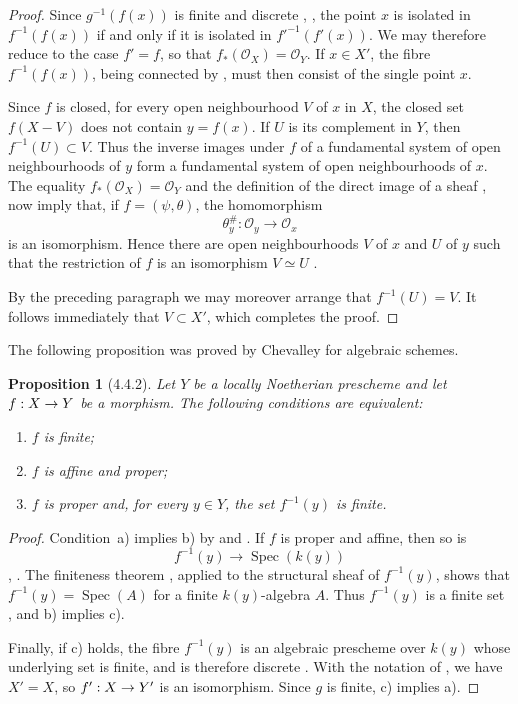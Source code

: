 \documentclass[oneside]{amsart}
\theoremstyle{ega-env-style}
\theoremstyle{ega-thm-env-style}
\newtheorem*{proposition}{Proposition}
\theoremstyle{ega-defn-env-style}
\def\mathcal{\mathscr}
\def\sh{\mathcal}                   %
\def\kres{k}                        %
\def\Spec{\operatorname{Spec}}
\renewcommand{\to}{\mathchoice{\longrightarrow}{\rightarrow}{\rightarrow}{\rightarrow}}
\def\isoto{\simeq} %
\newcommand{\oldpage}[2][]{{\marginnote{\normalfont{\textbf{#1}~|~#2}}}\ignorespaces}
\let\EGAOriginalLabel\label
\renewcommand{\label}[1]{\phantomsection\EGAOriginalLabel{#1}}
\begin{document}
\begin{proof}
Since $g^{-1}(f(x))$ is finite and discrete
, , the point $x$ is isolated in
$f^{-1}(f(x))$ if and only if it is isolated in
$f'^{-1}(f'(x))$.  We may therefore reduce to the case $f'=f$, so
that $f_*(\sh{O}_X)=\sh{O}_Y$.  If $x\in X'$, the fibre
$f^{-1}(f(x))$, being connected by , must then
consist of the single point $x$.

Since $f$ is closed, for every open neighbourhood $V$ of $x$ in
$X$, the closed set $f(X-V)$ does not contain $y=f(x)$.  If $U$ is
its complement in $Y$, then $f^{-1}(U)\subset V$.  Thus the inverse
images under $f$ of a fundamental system of open neighbourhoods of
$y$ form a fundamental system of open neighbourhoods of $x$.
The equality $f_*(\sh{O}_X)=\sh{O}_Y$ and the definition of the
direct image of a sheaf ,  now
imply that, if $f=(\psi,\theta)$, the homomorphism
\[
  \theta_y^\#:\sh{O}_y\longrightarrow\sh{O}_x
\]
is an isomorphism.  Hence there are open neighbourhoods $V$ of $x$
and $U$ of $y$ such that the restriction of $f$ is an isomorphism
$V\isoto U$ .

\oldpage[III]{136}

By the preceding paragraph we may moreover arrange that
$f^{-1}(U)=V$.  It follows immediately that $V\subset X'$, which
completes the proof.
\end{proof}

The following proposition was proved by Chevalley for algebraic
schemes.

\begin{proposition}[4.4.2]
\label{III.4.4.2}
Let $Y$ be a locally Noetherian prescheme and let $f:X\to Y$ be a
morphism.  The following conditions are equivalent:
\begin{enumerate}
  \item[{\rm a)}] $f$ is finite;
  \item[{\rm b)}] $f$ is affine and proper;
  \item[{\rm c)}] $f$ is proper and, for every $y\in Y$, the set
    $f^{-1}(y)$ is finite.
\end{enumerate}
\end{proposition}

\begin{proof}
Condition~a) implies b) by  and
.  If $f$ is proper and affine, then so is
\[
  f^{-1}(y)\longrightarrow\Spec(\kres(y))
\]
, .  The finiteness theorem
, applied to the structural sheaf of $f^{-1}(y)$,
shows that $f^{-1}(y)=\Spec(A)$ for a finite
$\kres(y)$-algebra $A$.  Thus $f^{-1}(y)$ is a finite set
, and b) implies c).

Finally, if c) holds, the fibre $f^{-1}(y)$ is an algebraic
prescheme over $\kres(y)$ whose underlying set is finite, and is
therefore discrete .  With the notation of
, we have $X'=X$, so
$f':X\to Y'$ is an isomorphism.  Since $g$ is finite, c) implies
a).
\end{proof}
\end{document}
